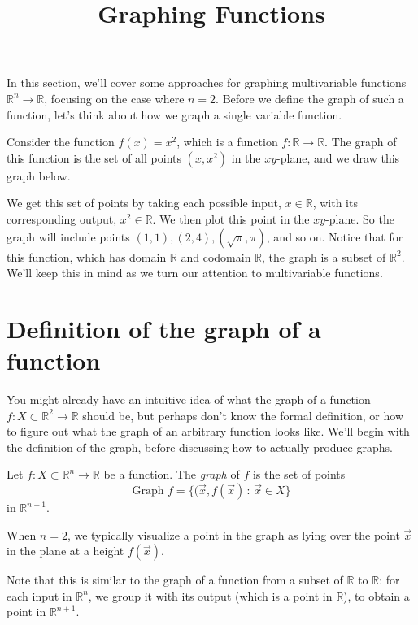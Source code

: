 \documentclass{ximera}
\title{Graphing Functions}
\begin{document}
\begin{abstract}
\end{abstract}
\maketitle

In this section, we'll cover some approaches for graphing multivariable functions $\mathbb{R}^n\rightarrow\mathbb{R}$, focusing on the case where $n=2$. Before we define the graph of such a function, let's think about how we graph a single variable function.

Consider the function $f(x) = x^2$, which is a function $f:\mathbb{R}\rightarrow\mathbb{R}$. The graph of this function is the set of all points $(x,x^2)$ in the $xy$-plane, and we draw this graph below.


We get this set of points by taking each possible input, $x\in\mathbb{R}$, with its corresponding output, $x^2\in\mathbb{R}$. We then plot this point in the $xy$-plane. So the graph will include points $(1,1), (2,4), (\sqrt{\pi}, \pi)$, and so on. Notice that for this function, which has domain $\mathbb{R}$ and codomain $\mathbb{R}$, the graph is a subset of $\mathbb{R}^2$. We'll keep this in mind as we turn our attention to multivariable functions.

\section*{Definition of the graph of a function}

You might already have an intuitive idea of what the graph of a function $f:X\subset\mathbb{R}^2\rightarrow\mathbb{R}$ should be, but perhaps don't know the formal definition, or how to figure out what the graph of an arbitrary function looks like. We'll begin with the definition of the graph, before discussing how to actually produce graphs.

\begin{definition}
Let $f:X\subset\mathbb{R}^n\rightarrow\mathbb{R}$ be a function. The \emph{graph} of $f$ is the set of points
\[
\textrm{Graph }f = \{(\vec{x},f(\vec{x})\,:\,\vec{x}\in X\}
\]
in $\mathbb{R}^{n+1}$.

When $n=2$, we typically visualize a point in the graph as lying over the point $\vec{x}$ in the plane at a height $f(\vec{x})$.
\end{definition}

Note that this is similar to the graph of a function from a subset of $\mathbb{R}$ to $\mathbb{R}$: for each input in $\mathbb{R}^n$, we group it with its output (which is a point in $\mathbb{R}$), to obtain a point in $\mathbb{R}^{n+1}$.
\end{document}
